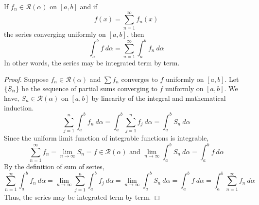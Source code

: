 \begin{corollary}
	If $f_n \in \mathscr{R}(\alpha)$ on $[a,b]$ and if
	\[ f(x) = \sum_{n = 1}^\infty f_n(x) \]
	the series converging uniformly on $[a,b]$, then
	\[ \int_a^b f\ d\alpha = \sum_{n=1}^\infty \int_a^b f_n \ d\alpha \]
	In other words, the series may be integrated term by term.
\end{corollary}
\begin{proof}
	Suppose $f_n \in \mathscr{R}(\alpha)$ and $\sum f_n$ converges to $f$ uniformly on $[a,b]$.
	Let $\left\{S_n\right\}$ be the sequence of partial sums converging to $f$ uniformly on $[a,b]$.
	We have, $S_n \in \mathscr{R}(\alpha)$ on $[a,b]$ by linearity of the integral and mathematical induction.
	\[ \sum_{j = 1}^n \int_a^b f_n\ d\alpha = \int_a^b \sum_{j = 1}^n f_j\ d\alpha = \int_a^b S_n\ d\alpha \]
	Since the uniform limit function of integrable functions is integrable,
	\[ \sum_{n = 1}^\infty f_n = \lim_{n \to \infty} S_n  = f \in \mathscr{R}(\alpha) \text{ and } \lim_{n \to \infty} \int_a^b S_n\ d\alpha = \int_a^b f\ d\alpha \]
	By the definition of sum of series,
	\[ \sum_{n = 1}^\infty \int_a^b f_n\ d\alpha = \lim_{n \to \infty} \sum_{j = 1}^n \int_a^b f_j\ d\alpha = \lim_{n \to \infty} \int_a^b S_n\ d\alpha = \int_a^b f\ d\alpha = \int_a^b \sum_{n = 1}^\infty f_n\ d\alpha \]
	Thus, the series may be integrated term by term.
\end{proof}

